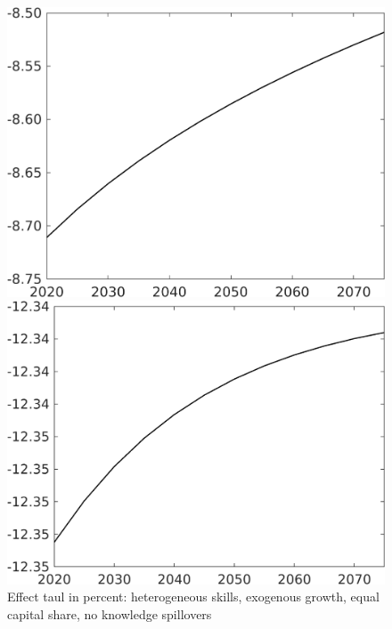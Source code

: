 \documentclass[12pt]{article}
\begin{document}
\begin{figure}[h!!]
	\centering
	\caption{Effect taul in percent: heterogeneous skills, exogenous growth, equal capital share, no knowledge spillovers }\label{fig:LF_BAU_nsk0_xgr1_equalcapShare_noknow}
	\begin{minipage}[]{0.32\textwidth}
		\includegraphics[width=1\textwidth]{../../codding_model/own_basedOnFried/optimalPol_010922_revision/figures/all_13Sept22/CompTaul_Equlab_LFBAUPer_Reg0_Emnet_spillover0_nsk0_xgr1_knspil1_sep1_countec0_GovRev0_etaa0.79.png}
	\end{minipage}	
	\begin{minipage}[]{0.32\textwidth}
		\includegraphics[width=1\textwidth]{../../codding_model/own_basedOnFried/optimalPol_010922_revision/figures/all_13Sept22/CompTaul_Equlab_LFBAUPer_Reg0_hh_spillover0_nsk0_xgr1_knspil1_sep1_countec0_GovRev0_etaa0.79.png}

\end{minipage}
\end{figure}
\end{document}
